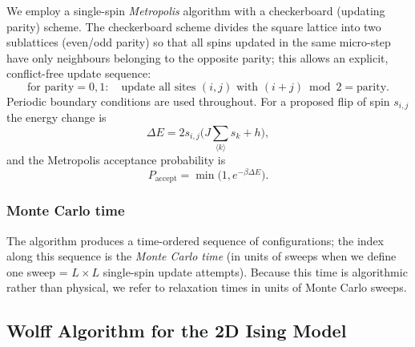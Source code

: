 \documentclass{article}
\begin{document}
We employ a single-spin \emph{Metropolis} algorithm with a checkerboard
(updating parity) scheme. The checkerboard scheme divides the square lattice
into two sublattices (even/odd parity) so that all spins updated in the same
micro-step have only neighbours belonging to the opposite parity; this allows
an explicit, conflict-free update sequence:
\begin{equation}
\text{for parity}=0,1:\quad \text{update all sites }(i,j)\text{ with }(i+j)\bmod 2=\text{parity}.
\end{equation}
Periodic boundary conditions are used throughout. For a proposed flip of spin
\(s_{i,j}\) the energy change is
\begin{equation}
\Delta E = 2 s_{i,j} \Big( J\sum_{\langle k\rangle} s_k + h \Big),
\end{equation}
and the Metropolis acceptance probability is
\begin{equation}
P_\text{accept} = \min\big(1, e^{-\beta\Delta E}\big).
\end{equation}

\subsubsection{Monte Carlo time}
The algorithm produces a time-ordered sequence of configurations; the index
along this sequence is the \emph{Monte Carlo time} (in units of sweeps when we
define one sweep = \(L\times L\) single-spin update attempts). Because this
time is algorithmic rather than physical, we refer to relaxation times in
units of Monte Carlo sweeps.


\subsection{Wolff Algorithm for the 2D Ising Model}
\end{document}
